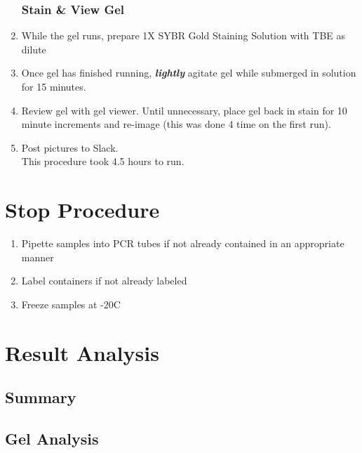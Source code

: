 \documentclass[letterpaper]{article}
\newcommand{\C}{\degree{}C}
\begin{document}
\begin{enumerate}
\subsubsection{Stain \& View Gel}
\item{While the gel runs, prepare 1X SYBR Gold Staining Solution with TBE as dilute}
\item{Once gel has finished running, \textbf{\textit{lightly}} agitate gel while submerged in solution for 15 minutes.}
\item{Review gel with gel viewer. Until unnecessary, place gel back in stain for 10 minute increments and re-image (this was done 4 time on the first run).}
\item{Post pictures to Slack.}\\
This procedure took 4.5 hours to run.
\end{enumerate} 

\section*{Stop Procedure}
\begin{enumerate}
\item{Pipette samples into PCR tubes if not already contained in an appropriate manner}
\item{Label containers if not already labeled}
\item{Freeze samples at -20\C{}}
\end{enumerate}

\section{Result Analysis}
\subsection{Summary}

\subsection{Gel Analysis}
\end{document}
